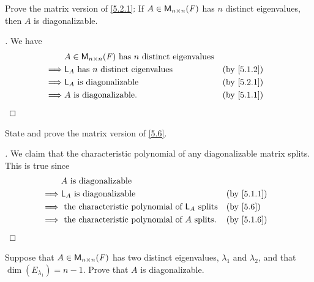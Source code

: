 \exercisesection

\setcounter{ex}{3}
\begin{ex}\label{ex:5.2.4}
  Prove the matrix version of \cref{5.2.1}:
  If \(A \in \mathsf{M}_{{n} \times n}({\mathit{F}})\) has \(n\) distinct eigenvalues, then \(A\) is diagonalizable.
\end{ex}

\begin{proof}[]
  We have
  \begin{align*}
             & A \in \ms{n}{n}{\F} \text{ has } n \text{ distinct  eigenvalues}                               \\
    \implies & \L_A \text{ has } n \text{ distinct  eigenvalues}                &  & \text{(by \cref{5.1.2})} \\
    \implies & \L_A \text{ is diagonalizable}                                   &  & \text{(by \cref{5.2.1})} \\
    \implies & A \text{ is diagonalizable}.                                     &  & \text{(by \cref{5.1.1})}
  \end{align*}
\end{proof}

\begin{ex}\label{ex:5.2.5}
  State and prove the matrix version of \cref{5.6}.
\end{ex}

\begin{proof}[]
  We claim that the characteristic polynomial of any diagonalizable matrix splits.
  This is true since
  \begin{align*}
             & A \text{ is diagonalizable}                                                                 \\
    \implies & \L_A \text{ is diagonalizable}                                &  & \text{(by \cref{5.1.1})} \\
    \implies & \text{ the characteristic polynomial of } \L_A \text{ splits} &  & \text{(by \cref{5.6})}   \\
    \implies & \text{ the characteristic polynomial of } A \text{ splits}.   &  & \text{(by \cref{5.1.6})}
  \end{align*}
\end{proof}

\setcounter{ex}{7}
\begin{ex}\label{ex:5.2.8}
  Suppose that \(A \in \mathsf{M}_{{n} \times n}({\mathit{F}})\) has two distinct eigenvalues, \(\lambda_1\) and \(\lambda_2\), and that \(\dim(E_{\lambda_1}) = n - 1\).
  Prove that \(A\) is diagonalizable.
\end{ex}

